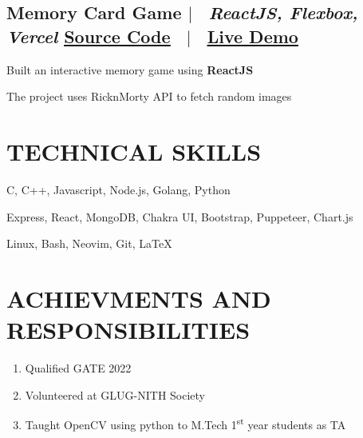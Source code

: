 \documentclass[10pt]{article}
\begin{document}
\subsection*{
  Memory Card Game 
  $|$ 
  \normalsize \normalfont \ \textit{ReactJS, Flexbox, Vercel }
  \hfill
  \normalsize \underline{\href{https://github.com/harsh-sheth/memory_card_game}{Source Code}}
  \ $|$ \ 
  \normalsize \underline{\href{https://harsh-sheth.github.io/memory_card_game}{Live Demo}}
}
  \begin{description}
    \setlength{\itemsep}{0em}
    \setlength{\itemindent}{2\parindent}
    \item[$\bullet$]{Built an interactive memory game using \textbf{ReactJS}}
    \item[$\bullet$]{The project uses RicknMorty API to fetch random images}
  \end{description}




\section{TECHNICAL SKILLS}
\begin{description}
  \setlength{\itemindent}{\parindent}
  \setlength{\itemsep}{0em}
  \item[Languages:]{C, C++, Javascript, Node.js, Golang, Python}
  \item[Web Technologies:]{Express, React, MongoDB, Chakra UI, Bootstrap, Puppeteer, Chart.js}
  \item[Tools:]{Linux, Bash, Neovim, Git, \LaTeX}
\end{description}


\section{ACHIEVMENTS AND RESPONSIBILITIES}
\begin{enumerate}
  \setlength{\itemsep}{0em}
  \item Qualified GATE 2022
  \item Volunteered at GLUG-NITH Society
  \item Taught OpenCV using python to M.Tech 1\textsuperscript{st} year students as TA
\end{enumerate}
\end{document}
